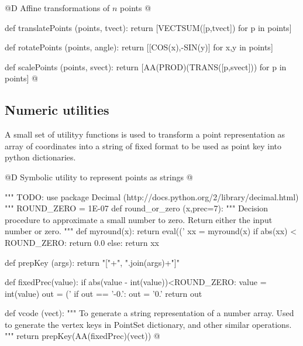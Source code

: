 \documentclass[11pt,oneside]{article}	%
\begin{document}
@D Affine transformations of $n$ points
@{def translatePoints (points, tvect):
	return [VECTSUM([p,tvect]) for p in points]

def rotatePoints (points, angle):
	return [[COS(x),-SIN(y)] for x,y in points]

def scalePoints (points, svect):
	return [AA(PROD)(TRANS([p,svect])) for p in points]
@}

\subsection{Numeric utilities}

A small set of utilityy functions is used to transform a point representation as array of coordinates into a string of fixed format to be used as point key into python dictionaries.

@D Symbolic utility to represent points as strings
@{""" TODO: use package Decimal (http://docs.python.org/2/library/decimal.html) """
ROUND_ZERO = 1E-07
def round_or_zero (x,prec=7):
	"""
	Decision procedure to approximate a small number to zero.
	Return either the input number or zero.
	"""
	def myround(x):
		return eval(('%
	xx = myround(x)
	if abs(xx) < ROUND_ZERO: return 0.0
	else: return xx

def prepKey (args): return "["+", ".join(args)+"]"

def fixedPrec(value):
	if abs(value - int(value))<ROUND_ZERO: value = int(value)
	out = ('%
	if out == '-0.': out = '0.'
	return out
	
def vcode (vect): 
	"""
	To generate a string representation of a number array.
	Used to generate the vertex keys in PointSet dictionary, and other similar operations.
	"""
	return prepKey(AA(fixedPrec)(vect))
@}






\end{document}
